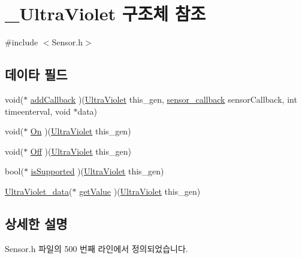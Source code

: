 \hypertarget{struct___ultra_violet}{\section{\-\_\-\-Ultra\-Violet 구조체 참조}
\label{struct___ultra_violet}
}


{\ttfamily \#include $<$Sensor.\-h$>$}

\subsection*{데이타 필드}
\begin{DoxyCompactItemize}
\item 
void($\ast$ \hyperlink{struct___ultra_violet_a90e8e8909dc65107be66027f73c2c888}{add\-Callback} )(\hyperlink{_sensor_8h_a387fe6cb5841dad3dbb90b1eed691ab6}{Ultra\-Violet} this\-\_\-gen, \hyperlink{_sensor_8h_ad8114207845fc5e0aa30832f0c718cd6}{sensor\-\_\-callback} sensor\-Callback, int timeenterval, void $\ast$data)
\item 
void($\ast$ \hyperlink{struct___ultra_violet_a753f8c2c790a977e4d8cd2e68ee10e76}{On} )(\hyperlink{_sensor_8h_a387fe6cb5841dad3dbb90b1eed691ab6}{Ultra\-Violet} this\-\_\-gen)
\item 
void($\ast$ \hyperlink{struct___ultra_violet_a4eaa529090e12bd7eb2a2c568f0c0539}{Off} )(\hyperlink{_sensor_8h_a387fe6cb5841dad3dbb90b1eed691ab6}{Ultra\-Violet} this\-\_\-gen)
\item 
bool($\ast$ \hyperlink{struct___ultra_violet_a3c866c9d5dac5b54f8dabd80f2111c4c}{is\-Supported} )(\hyperlink{_sensor_8h_a387fe6cb5841dad3dbb90b1eed691ab6}{Ultra\-Violet} this\-\_\-gen)
\item 
\hyperlink{_sensor_8h_a7638ff5043cb10408c5bd3c3aef6e01c}{Ultra\-Violet\-\_\-data}($\ast$ \hyperlink{struct___ultra_violet_ad2f32aac4a27630b46e825c41eee7eb3}{get\-Value} )(\hyperlink{_sensor_8h_a387fe6cb5841dad3dbb90b1eed691ab6}{Ultra\-Violet} this\-\_\-gen)
\end{DoxyCompactItemize}


\subsection{상세한 설명}


Sensor.\-h 파일의 500 번째 라인에서 정의되었습니다.



